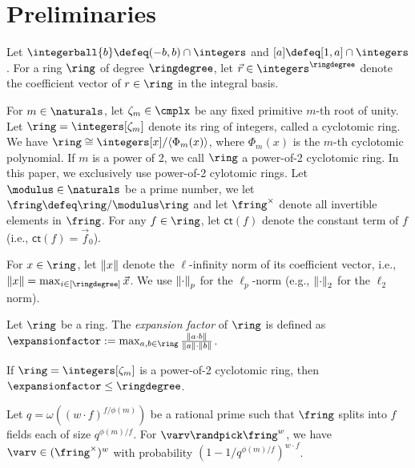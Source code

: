 \section{Preliminaries}
\label{sec:ow-preliminaries}

Let $\integerball{b} \defeq (-b,b) \cap \integers$ and $[a] \defeq [1,a] \cap \integers$. For a ring $\ring$ of degree $\ringdegree$, let $\vec{r} \in \integers^\ringdegree$ denote the coefficient vector of $r \in \ring$ in the integral basis.

For $m \in \naturals$, let $\zeta_m \in \cmplx$ be any fixed primitive $m$-th root of unity.  Let $\ring = \integers[\zeta_m]$ denote its ring of integers, called a cyclotomic ring.  We have $\ring \cong \integers[x]/\langle \Phi_m(x) \rangle$, where $\Phi_m(x)$ is the $m$-th cyclotomic polynomial.  If $m$ is a power of 2, we call $\ring$ a power-of-2 cyclotomic ring.  In this paper, we exclusively use power-of-2 cylotomic rings.  Let $\modulus \in \naturals$ be a prime number, we let $\fring \defeq \ring/\modulus\ring$ and let $\fring^\times$ denote all invertible elements in $\fring$.
For any $f \in \ring$, let $\mathsf{ct}(f)$ denote the constant term of $f$ (i.e., $\mathsf{ct}(f) = \vec{f}_0$).

For $x \in \ring$, let $\left\lVert x \right\rVert$ denote the $\ell$-infinity norm of its coefficient vector, i.e., $\norm{x} = \max_{i \in [\ringdegree]} \vec{x}$.  We use $\left\lVert \cdot \right\rVert_p$ for the $\ell_p$-norm (e.g., $\left\lVert \cdot \right\rVert_2$ for the $\ell_2$ norm).

\begin{definition} \label{def:ring-expansion-factor}
Let $\ring$ be a ring.  The \emph{expansion factor} of $\ring$ is defined as $\expansionfactor := \max_{a, b \in \ring} \frac{\norm{a \cdot
b}}{\norm{a}\cdot\norm{b}}$.
\end{definition}

\begin{theorem} \label{thm:expansion-factor}
        If $\ring = \integers[\zeta_m]$ is a power-of-2 cyclotomic ring, then $\expansionfactor \leq \ringdegree$.
\end{theorem}

\begin{theorem} \label{thm:invertibility}
        Let $q = \omega((w\cdot f)^{f/\phi(m)})$ be a rational prime such that $\fring$ splits into $f$ fields each of size $q^{\phi(m)/f}$. For $\varv \randpick \fring^w$, we have $\varv \in (\fring^\times)^w$ with probability $(1 - 1/q^{\phi(m)/f})^{w\cdot f}$.
\end{theorem}


